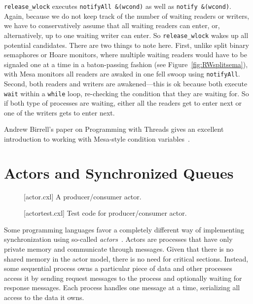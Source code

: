 \documentclass{report}
\newenvironment{code}{
\tcolorbox
}{
\endtcolorbox
}
\begin{document}
\texttt{release\_wlock} executes \texttt{notifyAll \&(wcond)} as well as
\texttt{notify \&(wcond)}.
Again, because we do not keep track of the number of waiting readers or writers, we
have to conservatively assume that all waiting readers can enter, or, alternatively,
up to one waiting writer can enter.  So \texttt{release\_wlock} wakes up all
potential candidates.
There are two things to note here.  First, unlike split binary semaphores or Hoare
monitors, where multiple waiting readers would have to be signaled one at a time in a
baton-passing fashion (see Figure~\ref{fig:RWsplitsema}), with Mesa monitors
all readers are awaked in one fell swoop using \texttt{notifyAll}.
Second, both readers and writers are awakened---this is ok because both execute
\texttt{wait} within a \texttt{while} loop, re-checking the condition that they
are waiting for.  So if both type of processes are waiting, either all the readers
get to enter next or one of the writers gets to enter next.

Andrew Birrell's paper on Programming with Threads gives an excellent
introduction to working with Mesa-style condition variables~\cite{Birrell89}.

\chapter{Actors and Synchronized Queues}

\begin{figure}
\begin{code}
\end{code}
\caption{[actor.cxl] A producer/consumer actor.}
\label{fig:actor}
\end{figure}

\begin{figure}
\begin{code}
\end{code}
\caption{[actortest.cxl] Test code for producer/consumer actor.}
\label{fig:actortest}
\end{figure}

Some programming languages favor a completely different way of implementing
synchronization using so-called \emph{actors}~\cite{HBS73}.  Actors are
processes that have only private memory and communicate through messages.
Given that there is no shared memory in the actor model, there is no need
for critical sections.  Instead, some sequential process owns a particular
piece of data and other processes access it by sending request messages
to the process and optionally waiting for response messages.  Each process
handles one message at a time, serializing all access to the data it owns.
\end{document}
